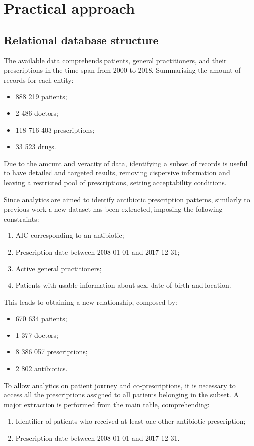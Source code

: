 \section{Practical approach}

\subsection{Relational database structure}
The available data comprehends patients, general practitioners, and their prescriptions in the time span from 2000 to 2018. Summarising the amount of records for each entity:
\begin{itemize}
	\item 888 219 patients;
	\item 2 486 doctors;
	\item 118 716 403 prescriptions;
	\item 33 523 drugs.
\end{itemize}

Due to the amount and veracity of data, identifying a subset of records is useful to have detailed and targeted results, removing dispersive information and leaving a restricted pool of prescriptions, setting acceptability conditions. 

Since analytics are aimed to identify antibiotic prescription patterns, similarly to previous work a new dataset has been extracted, imposing the following constraints:
\begin{enumerate}
	\item AIC corresponding to an antibiotic;
	\item Prescription date between 2008-01-01 and 2017-12-31;
	\item Active general practitioners;
	\item Patients with usable information about sex, date of birth and location.
\end{enumerate}

This leads to obtaining a new relationship, composed by:
\begin{itemize}
	\item 670 634 patients;
	\item 1 377 doctors;
	\item 8 386 057 prescriptions;
	\item 2 802 antibiotics.
\end{itemize}

To allow analytics on patient journey and co-prescriptions, it is necessary to access all the prescriptions assigned to all patients belonging in the subset. A major extraction is performed from the main table, comprehending:
\begin{enumerate}
	\item Identifier of patients who received at least one other antibiotic prescription;
	\item Prescription date between 2008-01-01 and 2017-12-31.
\end{enumerate}

